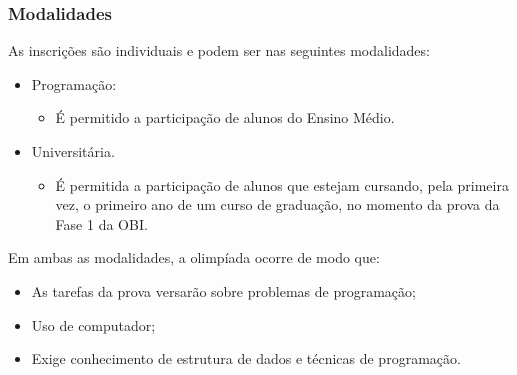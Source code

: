 \begin{frame}
 \frametitle{Modalidades}
 As inscrições são individuais e podem ser nas seguintes modalidades:
 \begin{itemize}
  \item Programação:
  \begin{itemize}
   \item É permitido a participação de alunos do Ensino Médio.
  \end{itemize}

  \item Universitária.
  \begin{itemize}
   \item É permitida a participação de alunos que estejam cursando, pela primeira vez,
   o primeiro ano de um curso de graduação, no momento da prova da Fase 1 da OBI.
  \end{itemize}
 \end{itemize}

  Em ambas as modalidades, a olimpíada ocorre de modo que:
  \begin{itemize}
   \item As tarefas da prova versarão sobre problemas de programação;
   \item Uso de computador;
   \item Exige conhecimento de estrutura de dados e técnicas de programação.
  \end{itemize}


\hfill
{}
\end{frame}

